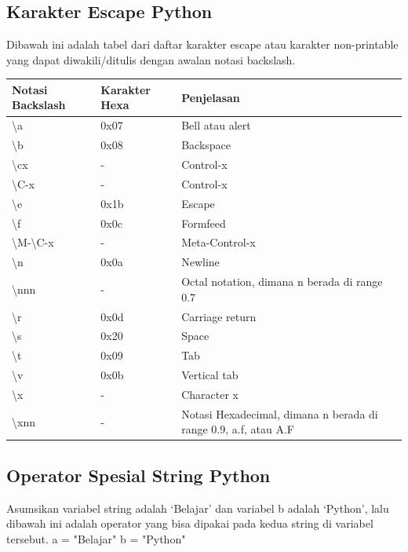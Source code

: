 \subsection{Karakter Escape Python}
Dibawah ini adalah tabel dari daftar karakter escape atau karakter non-printable yang dapat diwakili/ditulis dengan awalan notasi backslash.
\begin{center}
\begin{tabular}{ | m{3cm} | m{3cm} | m{3cm} | }
\hline
Notasi Backslash & Karakter Hexa & Penjelasan \\
\hline
\textbackslash a & 0x07 & Bell atau alert \\
\hline
\textbackslash b & 0x08 & Backspace \\
\hline
\textbackslash cx & - & Control-x \\
\hline
\textbackslash C-x & - & Control-x\\
\hline
\textbackslash e & 0x1b & Escape\\
\hline
\textbackslash f & 0x0c & Formfeed\\
\hline
\textbackslash M-\textbackslash C-x & - & Meta-Control-x\\
\hline
\textbackslash n & 0x0a & Newline\\
\hline
\textbackslash nnn & - & Octal notation, dimana n berada di range 0.7\\
\hline
\textbackslash r & 0x0d & Carriage return\\
\hline
\textbackslash s & 0x20 & Space\\
\hline
\textbackslash t & 0x09 & Tab\\
\hline
\textbackslash v & 0x0b & Vertical tab\\
\hline
\textbackslash x & - & Character x\\
\hline
\textbackslash xnn & - & Notasi Hexadecimal, dimana n berada di range 0.9, a.f, atau A.F\\
\hline
\end{tabular}
\end{center}

\subsection{Operator Spesial String Python}
Asumsikan variabel string adalah ‘Belajar’ dan variabel b adalah ‘Python’, lalu dibawah ini adalah operator yang bisa dipakai pada kedua string di variabel tersebut. a = "Belajar" b = "Python"

